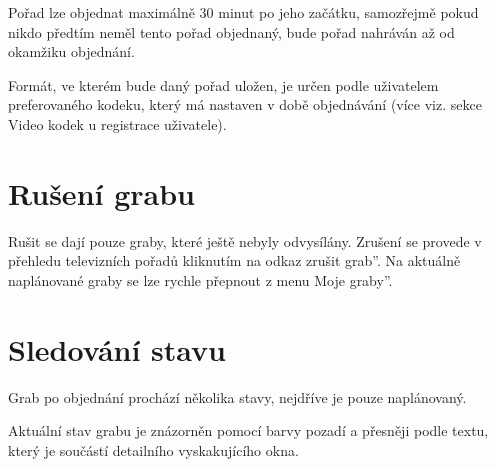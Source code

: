 Pořad lze objednat maximálně 30 minut po jeho začátku, samozřejmě pokud nikdo předtím neměl tento pořad objednaný, bude pořad nahráván až od okamžiku objednání.

Formát, ve kterém bude daný pořad uložen, je určen podle uživatelem preferovaného kodeku, který má nastaven v době objednávání (více viz. sekce Video kodek u registrace uživatele).

\section{Rušení grabu}

Rušit se dají pouze graby, které ještě nebyly odvysílány. Zrušení se provede v přehledu televizních pořadů kliknutím na odkaz \quotedblbase zrušit grab''. Na aktuálně naplánované graby se lze rychle přepnout z menu \quotedblbase Moje graby''.

\section{Sledování stavu}

Grab po objednání prochází několika stavy, nejdříve je pouze naplánovaný.

Aktuální stav grabu je znázorněn pomocí barvy pozadí a přesněji podle textu, který je součástí detailního vyskakujícího okna.

